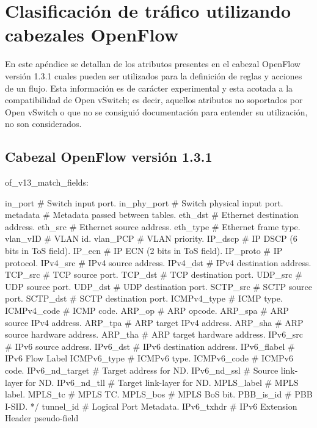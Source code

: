 
\chapter{Clasificaci\'on de tr\'afico utilizando cabezales OpenFlow}
\label{appendix3}

En este ap\'endice se detallan de los atributos presentes en el cabezal OpenFlow versi\'on 1.3.1 cuales pueden ser utilizados para la definici\'on de reglas y acciones de un flujo. Esta informaci\'on es de carácter experimental y esta acotada a la compatibilidad de Open vSwitch; es decir, aquellos atributos no soportados por Open vSwitch o que no se consiguió documentaci\'on para entender su utilizaci\'on, no son considerados.

\section{Cabezal OpenFlow versi\'on 1.3.1} 

\begin{python}
of_v13_match_fields:
      
	in_port			# Switch input port.
	in_phy_port 	# Switch physical input port. 
	metadata 		# Metadata passed between tables. 
	eth_dst 		# Ethernet destination address.
	eth_src 		# Ethernet source address. 
	eth_type 		# Ethernet frame type. 
	vlan_vID 		# VLAN id. 
	vlan_PCP		# VLAN priority. 
	IP_dscp 		# IP DSCP (6 bits in ToS field). 
	IP_ecn  		# IP ECN (2 bits in ToS field). 
	IP_proto		# IP protocol. 
	IPv4_src 		# IPv4 source address. 
	IPv4_dst 		# IPv4 destination address. 
	TCP_src 		# TCP source port. 
	TCP_dst 		# TCP destination port. 
	UDP_src 		# UDP source port. 
	UDP_dst 		# UDP destination port. 
	SCTP_src 		# SCTP source port. 
	SCTP_dst 		# SCTP destination port. 
	ICMPv4_type 	# ICMP type. 
	ICMPv4_code 	# ICMP code. 
	ARP_op			# ARP opcode. 
	ARP_spa 		# ARP source IPv4 address. 
	ARP_tpa 		# ARP target IPv4 address. 
	ARP_sha 		# ARP source hardware address. 
	ARP_tha 		# ARP target hardware address. 
	IPv6_src 		# IPv6 source address. 
	IPv6_dst 		# IPv6 destination address. 
	IPv6_flabel 	# IPv6 Flow Label 
	ICMPv6_type 	# ICMPv6 type. 
	ICMPv6_code 	# ICMPv6 code. 
	IPv6_nd_target 	# Target address for ND. 
	IPv6_nd_ssl 	# Source link-layer for ND. 
	IPv6_nd_tll  	# Target link-layer for ND. 
	MPLS_label 		# MPLS label. 
	MPLS_tc 		# MPLS TC. 
	MPLS_bos		# MPLS BoS bit. 
	PBB_is_id 		# PBB I-SID. */
	tunnel_id 		# Logical Port Metadata. 
	IPv6_txhdr 		# IPv6 Extension Header pseudo-field 
		
\end{python}

